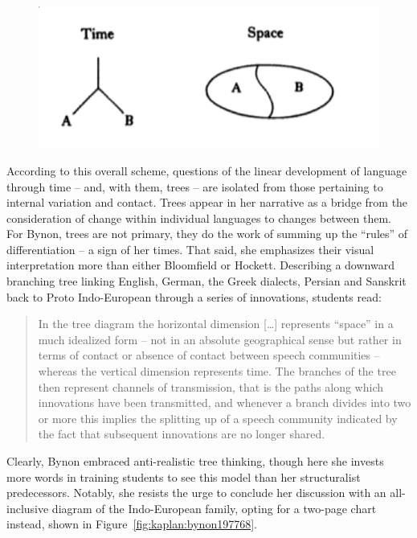 \documentclass[output=paper]{langscibook}
\begin{document}
\begin{figure}
    \centering
    \includegraphics[scale=1]{figures/bynon1977.png}
    \caption{\citet[173]{Bynon1977}}
    \label{fig:kaplan:bynon1977}
\end{figure}

According to this overall scheme, questions of the linear development of language through time – and, with them, trees – are isolated from those pertaining to internal variation and contact. Trees appear in her narrative as a bridge from the consideration of change within individual languages to changes between them. For Bynon, trees are not primary, they do the work of summing up the ``rules'' of differentiation – a sign of her times. That said, she emphasizes their visual interpretation more than either Bloomfield or Hockett. Describing a downward branching tree linking English, German, the Greek dialects, Persian and Sanskrit back to Proto Indo-European through a series of innovations, students read:

\begin{quotation}
In the tree diagram the horizontal dimension […] represents ``space'' in a much idealized form – not in an absolute geographical sense but rather in terms of contact or absence of contact between speech communities – whereas the vertical dimension represents time. The branches of the tree then represent channels of transmission, that is the paths along which innovations have been transmitted, and whenever a branch divides into two or more this implies the splitting up of a speech community indicated by the fact that subsequent innovations are no longer shared. \citep[66]{Bynon1977}
\end{quotation}

Clearly, Bynon embraced anti-realistic tree thinking, though here she invests more words in training students to see this model than her structuralist predecessors. Notably, she resists the urge to conclude her discussion with an all-inclusive diagram of the Indo-European family, opting for a two-page chart instead, shown in Figure~\ref{fig:kaplan:bynon197768}.
\end{document}
